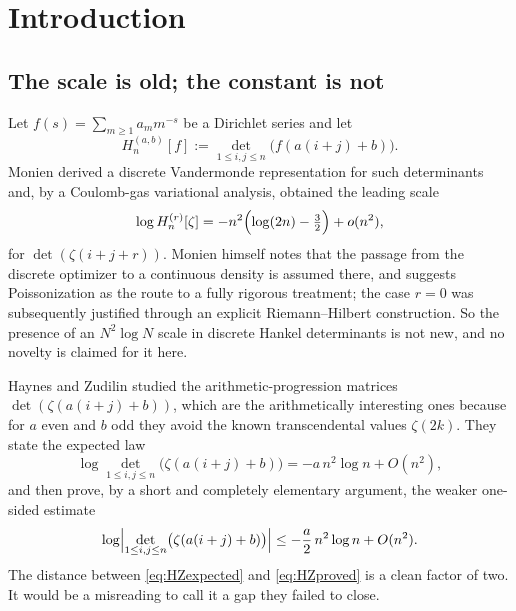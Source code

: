 \documentclass[11pt]{amsart}
\numberwithin{equation}{section}
\theoremstyle{plain}
\theoremstyle{definition}
\theoremstyle{remark}
\begin{document}
\begin{abstract}
A numerical section confirms the constant to three digits and, more importantly, documents a
trap: naive local exponent estimators are biased at order $\log\log N/\log N$ by the slowly
varying factor, so finite-$N$ fits drift far from $-\beta$ even when the theorem is exact.
\end{abstract}

\maketitle

\section{Introduction}

\subsection{The scale is old; the constant is not}

Let $f(s)=\sum_{m\ge1}a_{m}m^{-s}$ be a Dirichlet series and let
\[
H_{n}^{(a,b)}[f]:=\det_{1\le i,j\le n}\bigl(f(a(i+j)+b)\bigr).
\]
Monien \cite{Monien2009} derived a discrete Vandermonde representation for such determinants and,
by a Coulomb-gas variational analysis, obtained the leading scale
\begin{equation}
\log H_{n}^{(r)}[\zeta]=-n^{2}\Bigl(\log (2n)-\tfrac32\Bigr)+o(n^{2}),
\label{eq:monien}
\end{equation}
for $\det(\zeta(i+j+r))$. Monien himself notes that the passage from the discrete optimizer to a
continuous density is assumed there, and suggests Poissonization as the route to a fully rigorous
treatment; the case $r=0$ was subsequently justified through an explicit Riemann--Hilbert
construction. So the presence of an $N^{2}\log N$ scale in discrete Hankel determinants is not new,
and no novelty is claimed for it here.

Haynes and Zudilin \cite{HaynesZudilin2015} studied the arithmetic-progression matrices
$\det(\zeta(a(i+j)+b))$, which are the arithmetically interesting ones because for $a$ even and $b$
odd they avoid the known transcendental values $\zeta(2k)$. They state the expected law
\begin{equation}
\log\det_{1\le i,j\le n}\bigl(\zeta(a(i+j)+b)\bigr)=-a\,n^{2}\log n+O(n^{2}),
\label{eq:HZexpected}
\end{equation}
and then prove, by a short and completely elementary argument, the weaker one-sided estimate
\begin{equation}
\log\Bigl|\det_{1\le i,j\le n}\bigl(\zeta(a(i+j)+b)\bigr)\Bigr|\le-\frac a2\,n^{2}\log n+O(n^{2}).
\label{eq:HZproved}
\end{equation}
The distance between \eqref{eq:HZexpected} and \eqref{eq:HZproved} is a clean factor of two.
It would be a misreading to call it a gap they failed to close.
\end{document}
